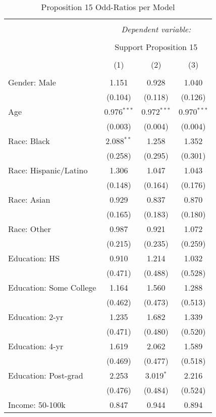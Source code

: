 
\begin{table}[!htbp] \centering 
  \caption{Proposition 15 Odd-Ratios per Model} 
  \label{} 
\footnotesize 
\begin{tabular}{@{\extracolsep{5pt}}lccc} 
\\[-1.8ex]\hline 
\hline \\[-1.8ex] 
 & \multicolumn{3}{c}{\textit{Dependent variable:}} \\ 
\cline{2-4} 
\\[-1.8ex] & \multicolumn{3}{c}{Support Proposition 15} \\ 
\\[-1.8ex] & (1) & (2) & (3)\\ 
\hline \\[-1.8ex] 
 Gender: Male & 1.151 & 0.928 & 1.040 \\ 
  & (0.104) & (0.118) & (0.126) \\ 
  Age & 0.976$^{***}$ & 0.972$^{***}$ & 0.970$^{***}$ \\ 
  & (0.003) & (0.004) & (0.004) \\ 
  Race: Black & 2.088$^{**}$ & 1.258 & 1.352 \\ 
  & (0.258) & (0.295) & (0.301) \\ 
  Race: Hispanic/Latino & 1.306 & 1.047 & 1.043 \\ 
  & (0.148) & (0.164) & (0.176) \\ 
  Race: Asian & 0.929 & 0.837 & 0.870 \\ 
  & (0.165) & (0.183) & (0.180) \\ 
  Race: Other & 0.987 & 0.921 & 1.072 \\ 
  & (0.215) & (0.235) & (0.259) \\ 
  Education: HS & 0.910 & 1.214 & 1.032 \\ 
  & (0.471) & (0.488) & (0.528) \\ 
  Education: Some College & 1.164 & 1.560 & 1.288 \\ 
  & (0.462) & (0.473) & (0.513) \\ 
  Education: 2-yr & 1.235 & 1.682 & 1.339 \\ 
  & (0.471) & (0.480) & (0.520) \\ 
  Education: 4-yr & 1.619 & 2.062 & 1.589 \\ 
  & (0.469) & (0.477) & (0.518) \\ 
  Education: Post-grad & 2.253 & 3.019$^{*}$ & 2.216 \\ 
  & (0.476) & (0.484) & (0.524) \\ 
  Income: 50-100k & 0.847 & 0.944 & 0.894 \\ 

\end{tabular}
\end{table}
